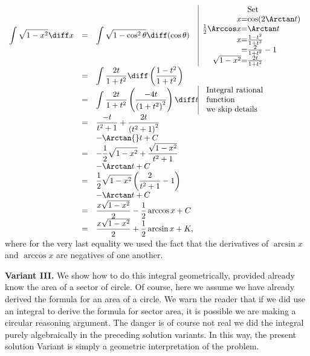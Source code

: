 {$
\begin{array}{rcl@{}l@{}|l}
\displaystyle \int \sqrt{1-x^2}\diff x &=&\displaystyle  \int \sqrt{1-\cos^2\theta}\diff (\cos \theta) &&\begin{array}{@{}r@{}c@{}l} &&\text{Set }\\
x&=&\cos(2\Arctan t)\\
\frac{1}{2}\Arccos x&=&\Arctan t\\ 
x&=&\frac{1-t^2}{1+t^2}\\
&=& \frac{2}{1+t^2}-1\\
\sqrt{1-x^2}&=&\frac{2t}{1+t^2}\\
\end{array}\\
&=&\displaystyle \int \frac{2t}{1+t^2}\diff \left(\frac{1-t^2}{1+t^2} \right) \\
&=&\displaystyle \int \frac{2t}{1+t^2} \left(\frac{-4t}{\left(1+t^2\right)^2}\right)\diff t &&\begin{array}{l}
\text{Integral rational}\\
\text{function}\\
\text{we skip details}
\end{array} \\
&=&\displaystyle \frac{-t}{t^{2}+1}+\frac{2 t}{ \left(t^{2}+1\right)^{2}}\\
&&\displaystyle - \Arctan{}t+C \\
&=&\displaystyle -\frac{1}{2}\sqrt{1-x^2} +\frac{\sqrt{1-x^2}}{t^2+1} \\
&&- \Arctan t+C\\
&=&\displaystyle \frac{1}{2} \sqrt{1-x^2} \left(\frac{ 2}{ t^2 +1} -1\right)\\
&&-\Arctan t+C\\
&=&\displaystyle \frac{x\sqrt{1-x^2}}{2}-\frac{1}{2}\arccos x+C\\
&=&\displaystyle \frac{x\sqrt{1-x^2}}{2}+\frac{1}{2}\arcsin x+K,
\end{array}
$
where for the very last equality we used the fact that the derivatives of $\arcsin x$ and $\arccos x$ are negatives of one another.

\textbf{Variant III. } We show how to do this integral geometrically, provided already know the area of a sector of circle. Of course, here we assume we have already derived the formula for an area of a circle. We warn the reader that if we did use an integral to derive the formula for sector area, it is possible we are making a circular reasoning argument. The danger is of course not real we did the integral purely algebraically in the preceding solution variants. In this way, the present solution Variant is simply a geometric interpretation of the problem.

}
